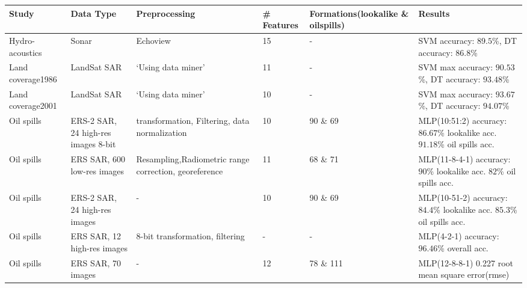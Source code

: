 \begin{table*}[t]

\advance\leftskip-3cm
\tabcolsep=0.19cm
\small
\centering


\begin{adjustbox}{width=\textwidth,totalheight=\textheight,keepaspectratio}
\begin{tabular}{*{6}{|l|}}

\toprule[1.5pt]
  \textbf{Study} & \textbf{Data Type} & \textbf{Preprocessing} & \# \textbf{Features} & \textbf{Formations(lookalike \& oilspills)} & \textbf{Results} \\
    \hline
  
    Hydro-acoustics \cite{Robotham2011170} & Sonar & Echoview & 15 &  - & SVM accuracy: $89.5$\%, DT accuracy: $86.8$\% \\

    Land coverage1986 \cite{Otukei2010S27} & LandSat SAR & `Using data miner' & 11 &  - & SVM max accuracy: $90.53$\%, DT accuracy: $93.48$\% \\

    Land coverage2001 \cite{Otukei2010S27} & LandSat SAR & `Using data miner' & 10 &  - & SVM max accuracy: $93.67$\%, DT accuracy: $94.07$\% \\ 
    
    Oil spills\cite{Topouzelis200762} & ERS-2 SAR, 24 high-res images 8-bit & transformation, Filtering, data normalization & 10 & 90  \& 69  & MLP(10:51:2) accuracy: $86.67$\% lookalike acc. $91.18$\% oil spills acc.\\
    
    Oil spills\cite{Delfrate200038} & ERS SAR, 600 low-res images & Resampling,Radiometric range correction, georeference & 11 & 68  \& 71  & MLP(11-8-4-1) accuracy: $90$\% lookalike acc. $82$\% oil spills acc.\\
    
    Oil spills\cite{Topouzelis200930} &  ERS-2 SAR, 24 high-res images & - & 10 & 90 \& 69  & MLP(10-51-2) accuracy: $84.4$\% lookalike acc. $85.3$\% oil spills acc.\\
    
    Oil spills\cite{Topouzelis200924} &  ERS SAR, 12 high-res images & 8-bit transformation, filtering & - & - & MLP(4-2-1) accuracy: $96.46$\% overall acc. \\
 
    Oil spills\cite{Delfrate2004} &  ERS SAR, 70 images & - & 12 & 78 \& 111  & MLP(12-8-8-1) 0.227 root mean square error(rmse)\\
    

\end{tabular}
\end{adjustbox}
\end{table*}
